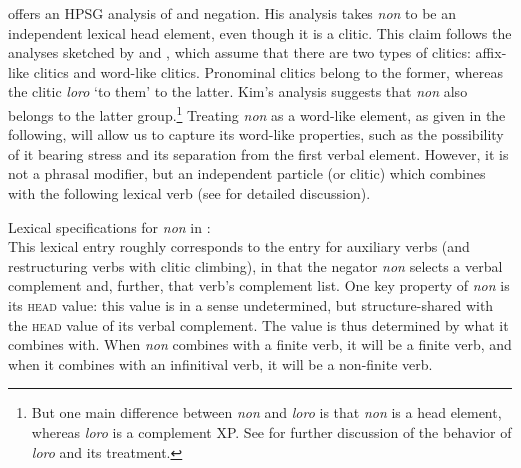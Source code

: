 \documentclass[output=paper
	        ,collection
	        ,collectionchapter
 	        ,biblatex
                ,babelshorthands
                ,newtxmath
                ,draftmode
                ,colorlinks, citecolor=brown
]{langscibook}
\begin{document}
\begin{exe}
\begin{xlist}
\citet{Kim:00} offers an HPSG analysis of  and  negation.
His analysis takes \textit{non}
to be an independent lexical head element, even though it is a clitic.
This claim follows the  analyses sketched by \citet{Monachesi:93} and \citet{Monachesi:98},
which assume that there are two types of clitics: affix-like
clitics and word-like clitics. Pronominal clitics belong to the
former, whereas the clitic \textit{loro} `to them' to the
latter. Kim's analysis suggests that \textit{non} also belongs
to the latter group.\footnote{But one main difference between
\textit{non} and \textit{loro} is that \textit{non} is a head
element, whereas \textit{loro} is a complement XP. See
\citet{Monachesi:98} for further discussion of the
behavior of \textit{loro} and its treatment.}
Treating \textit{non} as
a word-like element, as given in the following, will allow us to capture its word-like
properties, such as the possibility of it bearing stress and
its separation from the first verbal element. However, it is not a
phrasal modifier, but an independent particle (or clitic) which combines with
the following lexical  verb (see \citealt{Kim:00} for
detailed discussion).

\ea
\label{negation-non}
Lexical specifications for \textit{non} in :\\
\z
%
\noindent
This lexical entry roughly corresponds to the entry for
 auxiliary verbs (and restructuring verbs with clitic climbing),
in that the negator \textit{non} selects a verbal complement and, further, that verb's
complement list. One key property of \textit{non}
is its \textsc{head} value: this value is in a sense undetermined, but structure-shared with the \textsc{head} value of its verbal complement.
The value is thus
determined by what it combines with. When \textit{non} combines with a finite
verb, it will be a finite verb, and when it combines with an infinitival verb, it will be a
non-finite verb.


\end{xlist}
\end{exe}
\end{document}
